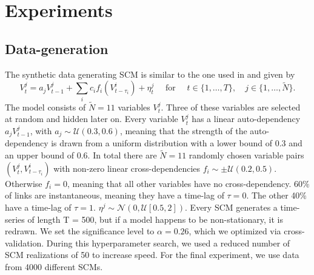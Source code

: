 \documentclass[conference]{IEEEtran}
\begin{document}



\section{Experiments}
\subsection{Data-generation}
The synthetic data generating SCM is similar to the one used in \cite{gerhardus_high-recall_2021} and given by
\begin{equation}
V_{t}^{j}=a_{j} V_{t-1}^{j}+\sum_{i} c_{i} f_{i}\left(V_{t-\tau_{i}}^{i}\right)+\eta_{t}^{j} \quad \text { for } \quad t \in\{1, \ldots, T\}, \quad j \in\{1, \ldots, \tilde{N} \}.
\end{equation}
The model consists of $\tilde{N}=11$ variables $V_t^j$. Three of these variables are selected at random and hidden later on.
Every variable $V_t^j$ has a linear auto-dependency $a_j V_{t-1}^{j}$, with $a_j \sim \mathcal{U}(0.3,0.6)$, meaning that the strength of the auto-dependency is drawn from a uniform distribution with a lower bound of 0.3 and an upper bound of 0.6.
In total there are $\tilde{N}=11$ randomly chosen variable pairs $(V_t^j,V^i_{t-\tau_i})$ with non-zero linear cross-dependencies $f_i \sim \pm \mathcal{U}(0.2,0.5)$. Otherwise $f_i=0$, meaning that all other variables have no cross-dependency.
60\% of links are instantaneous, meaning they have a time-lag of $\tau =0$. The other 40\% have a time-lag of $\tau=1$.
$\eta^{j} \sim \mathcal{N}(0,\mathcal{U}[0.5,2])$.
Every SCM generates a time-series of length T = 500, but if a model happens to be non-stationary, it is redrawn.
We set the significance level to $\alpha =0.26$, which we optimized via cross-validation. During this hyperparameter search, we used a reduced number of SCM realizations of 50 to increase speed.
For the final experiment, we use data from 4000 different SCMs.
\end{document}
